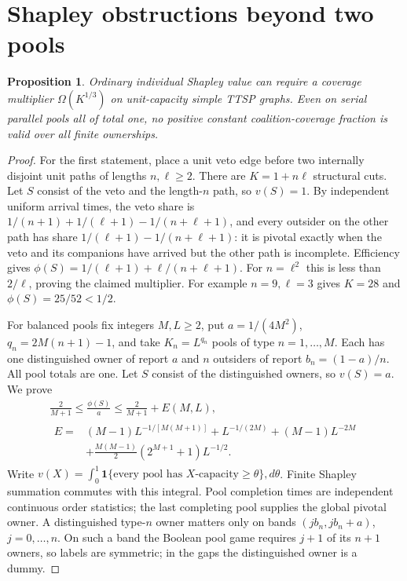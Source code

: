 \documentclass[11pt]{article}
\newtheorem{proposition}[theorem]{Proposition}
\theoremstyle{definition}\newtheorem{definition}[theorem]{Definition}
\theoremstyle{remark}\newtheorem{remark}[theorem]{Remark}
\newcommand{\ind}{\mathbf 1}
\begin{document}
\section{Shapley obstructions beyond two pools}\label{noise:shapley}
\begin{proposition}\label{noise:shapley-paths}
Ordinary individual Shapley value can require a coverage multiplier
$\Omega(K^{1/3})$ on unit-capacity simple TTSP graphs. Even on serial
parallel pools all of total one, no positive constant coalition-coverage
fraction is valid over all finite ownerships.
\end{proposition}
\begin{proof}
For the first statement, place a unit veto edge before two internally disjoint
unit paths of lengths $n,\ell\ge2$. There are $K=1+n\ell$ structural cuts.
Let $S$ consist of the veto and the length-$n$ path, so $v(S)=1$.
By independent uniform arrival times, the veto share is
$1/(n+1)+1/(\ell+1)-1/(n+\ell+1)$, and every outsider on the other path
has share $1/(\ell+1)-1/(n+\ell+1)$: it is pivotal exactly when the veto
and its companions have arrived but the other path is incomplete.
Efficiency gives
$\phi(S)=1/(\ell+1)+\ell/(n+\ell+1)$.
For $n=\ell^2$ this is less than $2/\ell$, proving the claimed multiplier.
For example $n=9,\ell=3$ gives $K=28$ and $\phi(S)=25/52<1/2$.

For balanced pools fix integers $M,L\ge2$, put $a=1/(4M^2)$,
$q_n=2M(n+1)-1$, and take $K_n=L^{q_n}$ pools of type $n=1,\ldots,M$.
Each has one distinguished owner of report $a$ and $n$ outsiders of report
$b_n=(1-a)/n$. All pool totals are one. Let $S$ consist of the distinguished
owners, so $v(S)=a$. We prove
\[
 \begin{gathered}
 \frac2{M+1}\le\frac{\phi(S)}a\le\frac2{M+1}+E(M,L),\\
 \begin{aligned}
 E={}&(M-1)L^{-1/[M(M+1)]}+L^{-1/(2M)}+(M-1)L^{-2M}\\
 &+\frac{M(M-1)}2(2^{M+1}+1)L^{-1/2}.
 \end{aligned}
 \end{gathered} \tag{D}
\]
Write $v(X)=\int_0^1\ind\{\text{every pool has $X$-capacity}\ge\theta\},d\theta$.
Finite Shapley summation commutes with this integral. Pool completion times
are independent continuous order statistics; the last completing pool
supplies the global pivotal owner. A distinguished type-$n$ owner matters
only on bands $(jb_n,jb_n+a)$, $j=0,\ldots,n$. On such a band the Boolean
pool game requires $j+1$ of its $n+1$ owners, so labels are symmetric;
in the gaps the distinguished owner is a dummy.


\end{proof}
\end{document}
